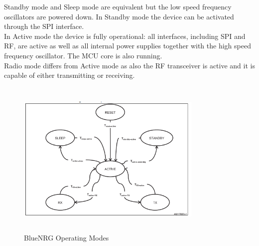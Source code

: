 Standby mode and Sleep mode are equivalent but the low speed frequency oscillators are powered down. In Standby mode the device can be activated through the SPI interface. \\
In Active mode the device is fully operational: all interfaces, including SPI and RF, are active as well as all internal power supplies together with the high speed frequency oscillator. The MCU core is also running. \\
Radio mode differs from Active mode as also the RF transceiver is active and it is capable of either transmitting or receiving.
\begin{figure}[ht]
	\centering
	\includegraphics[width=3.5in, height=3in]{images/operating_modes.png}
	\caption{BlueNRG Operating Modes}
\end{figure}
\begin{table}[ht]
	\centering
	\caption{BlueNRG operating modes summary}
\end{table}
